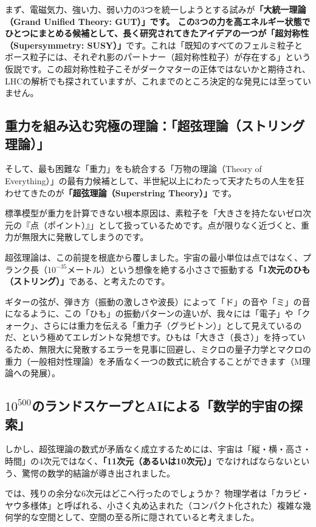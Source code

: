 まず、電磁気力、強い力、弱い力の3つを統一しようとする試みが\textbf{「大統一理論（Grand Unified Theory: GUT）」です。 この3つの力を高エネルギー状態でひとつにまとめる候補として、長く研究されてきたアイデアの一つが「超対称性（Supersymmetry: SUSY）」}です。これは「既知のすべてのフェルミ粒子とボース粒子には、それぞれ影のパートナー（超対称性粒子）が存在する」という仮説です。この超対称性粒子こそがダークマターの正体ではないかと期待され、LHCの解析でも探されていますが、これまでのところ決定的な発見には至っていません。

\subsection{重力を組み込む究極の理論：「超弦理論（ストリング理論）」}

そして、最も困難な「重力」をも統合する「万物の理論（Theory of Everything）」の最有力候補として、半世紀以上にわたって天才たちの人生を狂わせてきたのが\textbf{「超弦理論（Superstring Theory）」}です。

標準模型が重力を計算できない根本原因は、素粒子を「大きさを持たないゼロ次元の『点（ポイント）』」として扱っているためです。点が限りなく近づくと、重力が無限大に発散してしまうのです。

超弦理論は、この前提を根底から覆しました。宇宙の最小単位は点ではなく、プランク長（\(10^{-35}\)メートル）という想像を絶する小ささで振動する\textbf{「1次元のひも（ストリング）」}である、と考えたのです。

ギターの弦が、弾き方（振動の激しさや波長）によって「ド」の音や「ミ」の音になるように、この「ひも」の振動パターンの違いが、我々には「電子」や「クォーク」、さらには重力を伝える「重力子（グラビトン）」として見えているのだ、という極めてエレガントな発想です。ひもは「大きさ（長さ）」を持っているため、無限大に発散するエラーを見事に回避し、ミクロの量子力学とマクロの重力（一般相対性理論）を矛盾なく一つの数式に統合することができます（M理論への発展）。

\subsection{\(10^{500}\)のランドスケープとAIによる「数学的宇宙の探索」}

しかし、超弦理論の数式が矛盾なく成立するためには、宇宙は「縦・横・高さ・時間」の4次元ではなく、\textbf{「11次元（あるいは10次元）」}でなければならないという、驚愕の数学的結論が導き出されました。

では、残りの余分な6次元はどこへ行ったのでしょうか？ 物理学者は「カラビ・ヤウ多様体」と呼ばれる、小さく丸め込まれた（コンパクト化された）複雑な幾何学的な空間として、空間の至る所に隠されていると考えました。

